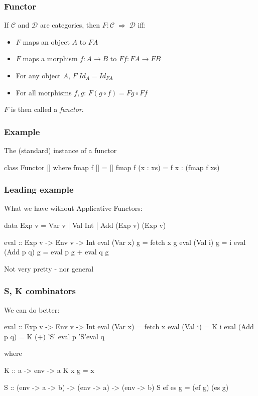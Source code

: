 \documentclass[18pt]{beamer}
\newcommand{\fto}{\;\Rightarrow\;}
\begin{document}
\begin{frame}[fragile] \frametitle{Functor}
  If $\mathcal{C}$ and $\mathcal{D}$ are categories, then $F \colon
  \mathcal{C} \fto \mathcal{D}$ iff:
  \begin{itemize}
  \item $F$ maps an object $A$ to $F A$
  \item $F$ maps a morphism $f \colon A \to B$ to $F f \colon F A \to
    F B$
  \item For any object $A$, $F \; Id_A = Id_{F A}$
  \item For all morphisms $f, g$: \quad $F (g \circ f) = F g \circ F f$
  \end{itemize}
  $F$ is then called a \emph{functor}.
\end{frame}

\begin{frame}[fragile] \frametitle{Example}
  The (standard) instance of a functor\\
  \begin{code}
    class Functor [] where
      fmap f [] = []
      fmap f (x : xs) = f x : (fmap f xs)
  \end{code}
\end{frame}

\begin{frame}[fragile] \frametitle{Leading example}
What we have without Applicative Functors:\\

\begin{code}
data Exp v = Var v
           | Val Int
           | Add (Exp v) (Exp v)

eval :: Exp v -> Env v -> Int
eval (Var x) g = fetch x g
eval (Val i) g = i
eval (Add p q) g = eval p g + eval q g
\end{code}
Not very pretty - nor general
\end{frame}

\begin{frame}[fragile] \frametitle{S, K combinators}
We can do better:\\
\begin{code}
eval :: Exp v -> Env v -> Int
eval (Var x) = fetch x
eval (Val i) = K i
eval (Add p q) = K (+) 'S' eval p 'S'eval q
\end{code}
where\\
\begin{code}
K :: a -> env -> a
K x g = x

S :: (env -> a -> b)
         -> (env -> a) -> (env -> b)
S ef es g = (ef g) (es g)
\end{code}
\end{frame}
\end{document}
